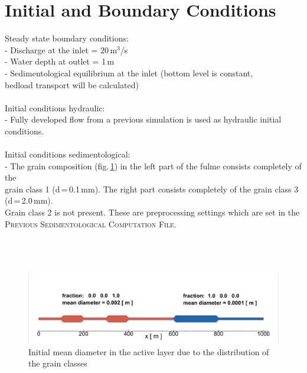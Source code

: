 \newpage
\section{Initial and Boundary Conditions}
%
Steady state boundary conditions:\\
  \hspace*{3mm} - Discharge at the inlet = 20\,m$^3$/s\\
  \hspace*{3mm} - Water depth at outlet = 1\,m\\
  \hspace*{3mm} - Sedimentological equilibrium at the inlet (bottom level is constant,\\
  \hspace*{5.3mm} bedload transport will be calculated)\\
\\
Initial conditions hydraulic:\\
  \hspace*{3mm} - Fully developed flow from a previous simulation is used as hydraulic initial conditions.\\
\\
Initial conditions sedimentological:\\
  \hspace*{3mm} - The grain composition (fig.\,\ref{E1iniDm}) in the left part of the fulme consists completely of the\\
  \hspace*{5.3mm} grain class 1 (d\,=\,0.1\,mm). The right part consists completely of the grain class 3 (d\,=\,2.0\,mm).\\
  \hspace*{5.3mm} Grain class 2 is not present. These are preprocessing settings which are set in the\\
  \hspace*{5.3mm} \textsc{Previous Sedimentological Computation File}.\\
\\
\\
\\
\begin{figure} [!h]
\centering
 \includegraphics[scale=0.175]{img/ini_grainsize.png}
 \caption{Initial mean diameter in the active layer due to the distribution of the grain classes }\label{E1iniDm}
\end{figure}




